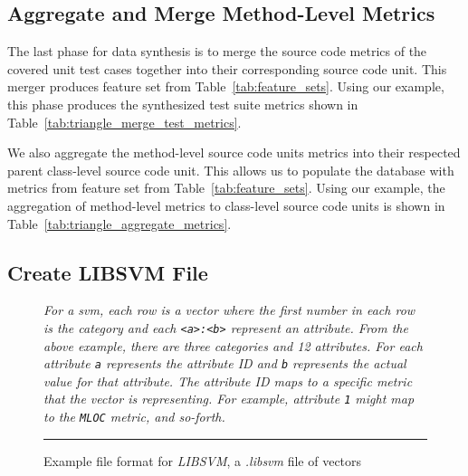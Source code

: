 \subsection{Aggregate and Merge Method-Level Metrics}
\label{subsec:approach_aggregate_merge_metrics}
The last phase for data synthesis is to merge the source code metrics of the covered unit test cases together into their corresponding source code unit. This merger produces feature set  from Table~\ref{tab:feature_sets}. Using our example, this phase produces the synthesized test suite metrics shown in Table~\ref{tab:triangle_merge_test_metrics}.

We also aggregate the method-level source code units metrics into their respected parent class-level source code unit. This allows us to populate the database with metrics from feature set  from Table~\ref{tab:feature_sets}. Using our example, the aggregation of method-level metrics to class-level source code units is shown in Table~\ref{tab:triangle_aggregate_metrics}.


\subsection{Create LIBSVM File}
\label{subsec:approach_create_libsvm_file}
\begin{figure}[!tb]
  \centering
  \begin{minipage}{9.5cm}
    
  \end{minipage}
  \caption{Example file format for \emph{LIBSVM}, a \emph{.libsvm} file of vectors}
  \vspace{1mm}
  \footnotesize{\emph{For a \gls{svm}, each row is a vector where the first number in each row is the category and each \texttt{<a>:<b>} represent an attribute. From the above example, there are three categories and 12 attributes. For each attribute \texttt{a} represents the attribute ID and \texttt{b} represents the actual value for that attribute. The attribute ID maps to a specific metric that the vector is representing. For example, attribute \texttt{1} might map to the \texttt{MLOC} metric, and so-forth.}}
  \vspace{2mm}
  \hrule
  \label{fig:libsvm_file}
\end{figure}

